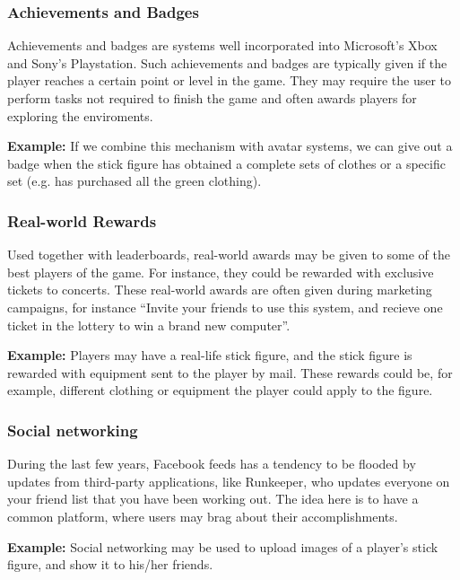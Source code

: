\subsubsection{Achievements and Badges}
\label{sec:achievementsandbadges}
Achievements and badges are systems well incorporated into Microsoft's Xbox and Sony's Playstation. Such achievements and badges are typically given if the player reaches a certain point or level in the game. They may require the user to perform tasks not required to finish the game and often awards players for exploring the enviroments. 

\textbf{Example:} If we combine this mechanism with avatar systems, we can give out a badge when the stick figure has obtained a complete sets of clothes or a specific set (e.g. has purchased all the green clothing).   

\subsubsection{Real-world Rewards}
\label{sec:realworldrewards}
Used together with leaderboards, real-world awards may be given to some of the best players of the game. For instance, they could be rewarded with exclusive tickets to concerts. These real-world awards are often given during marketing campaigns, for instance ``Invite your friends to use this system, and recieve one ticket in the lottery to win a brand new computer''.  

\textbf{Example:} Players may have a real-life stick figure, and the stick figure is rewarded with equipment sent to the player by mail. These rewards could be, for example, different clothing or equipment the player could apply to the figure. 

\subsubsection{Social networking}
\label{sec:socialnetworking}
During the last few years, Facebook feeds has a tendency to be flooded by updates from third-party applications, like Runkeeper, who updates everyone on your friend list that you have been working out. The idea here is to have a common platform, where users may brag about their accomplishments.      

\textbf{Example:} Social networking may be used to upload images of a player's stick figure, and show it to his/her friends. 

